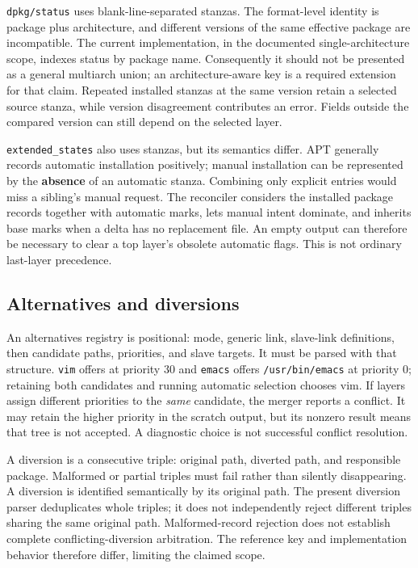 \texttt{dpkg/status} uses blank-line-separated stanzas. The format-level identity is package plus architecture, and different versions of the same effective package are incompatible. The current implementation, in the documented single-architecture scope, indexes status by package name. Consequently it should not be presented as a general multiarch union; an architecture-aware key is a required extension for that claim. Repeated installed stanzas at the same version retain a selected source stanza, while version disagreement contributes an error. Fields outside the compared version can still depend on the selected layer.

\texttt{extended\_states} also uses stanzas, but its semantics differ. \ac{APT} generally records automatic installation positively; manual installation can be represented by the \textbf{absence} of an automatic stanza. Combining only explicit entries would miss a sibling's manual request. The reconciler considers the installed package records together with automatic marks, lets manual intent dominate, and inherits base marks when a delta has no replacement file. An empty output can therefore be necessary to clear a top layer's obsolete automatic flags. This is not ordinary last-layer precedence.

\subsection{Alternatives and diversions}
\label{sec:arch:alternatives}

An alternatives registry is positional: mode, generic link, slave-link definitions, then candidate paths, priorities, and slave targets. It must be parsed with that structure. \texttt{vim} offers  at priority \num{30} and \texttt{emacs} offers \texttt{/usr/bin/emacs} at priority \num{0}; retaining both candidates and running automatic selection chooses vim. If layers assign different priorities to the \emph{same} candidate, the merger reports a conflict. It may retain the higher priority in the scratch output, but its nonzero result means that tree is not accepted. A diagnostic choice is not successful conflict resolution.

A diversion is a consecutive triple: original path, diverted path, and responsible package. Malformed or partial triples must fail rather than silently disappearing. A diversion is identified semantically by its original path. The present diversion parser deduplicates whole triples; it does not independently reject different triples sharing the same original path. Malformed-record rejection does not establish complete conflicting-diversion arbitration. The reference key and implementation behavior therefore differ, limiting the claimed scope.


